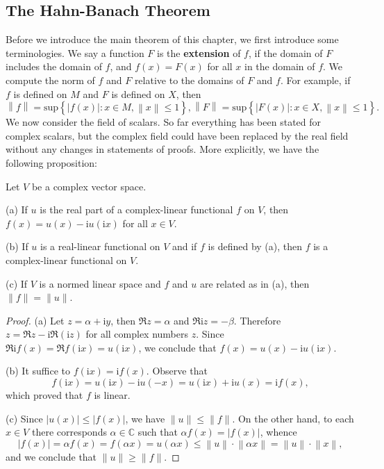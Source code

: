 \subsection{The Hahn-Banach Theorem}
Before we introduce the main theorem of this chapter, we first introduce some terminologies. We say a function $F$ is the \textbf{extension} of $f$, if the domain of $F$ includes the domain of $f$, and $f(x)=F(x)$ for all $x$ in the domain of $f$. We compute the norm of $f$ and $F$ relative to the domains of $F$ and $f$. For example, if $f$ is defined on $M$ and $F$ is defined on $X$, then 
$$
\left\| f \right\| =\mathrm{sup}\left\{ \left| f\left( x \right) \right|:x\in M,\left\| x \right\| \le 1 \right\} ,\left\| F \right\| =\mathrm{sup}\left\{ \left| F\left( x \right) \right|:x\in X,\left\| x \right\| \le 1 \right\} .
$$
We now consider the field of scalars. So far everything has been stated for complex scalars, but the complex field could have been replaced by the real field without any changes in statements of proofs. More explicitly, we have the following proposition: 
\begin{proposition}
Let $V$ be a complex vector space.\par
(a) If $u$ is the real part of a complex-linear functional $f$ on $V$, then $f(x)=u(x)-\mathrm{i}u(\mathrm{i}x)$ for all $x\in V$.\par
(b) If $u$ is a real-linear functional on $V$ and if $f$ is defined by (a), then $f$ is a complex-linear functional on $V$.\par
(c) If $V$ is a normed linear space and $f$ and $u$ are related as in (a), then $\|f\|=\|u\|$.
\end{proposition}
\begin{proof}
(a) Let $z=\alpha+\mathrm{i}y$, then $\Re z=\alpha$ and $\Re\mathrm{i}z=-\beta$. Therefore $z=\Re z-\mathrm{i}\Re(\mathrm{i}z)$ for all complex numbers $z$. Since $\Re \mathrm{i}f\left( x \right) =\Re f\left( \mathrm{i}x \right) =u\left( \mathrm{i}x \right) $, we conclude that $f(x)=u(x)-\mathrm{i}u(\mathrm{i}x)$.\par
(b) It suffice to $f(\mathrm{i}x)=\mathrm{i}f(x)$. Observe that 
$$
f\left( \mathrm{i}x \right) =u\left( \mathrm{i}x \right) -\mathrm{i}u\left( -x \right) =u\left( \mathrm{i}x \right) +\mathrm{i}u\left( x \right) =\mathrm{i}f\left( x \right) ,
$$
which proved that $f$ is linear.\par
(c) Since $|u(x)|\le|f(x)|$, we have $\|u\|\le\|f\|$. On the other hand, to each $x\in V$ there corresponds $\alpha\in\mathbb{C}$ such that $\alpha f(x)=|f(x)|$, whence 
$$
\left| f\left( x \right) \right|=\alpha f\left( x \right) =f\left( \alpha x \right) =u\left( \alpha x \right) \le \left\| u \right\| \cdot \left\| \alpha x \right\| =\left\| u \right\| \cdot \left\| x \right\| ,
$$
and we conclude that $\|u\|\ge\|f\|$.
\end{proof}
